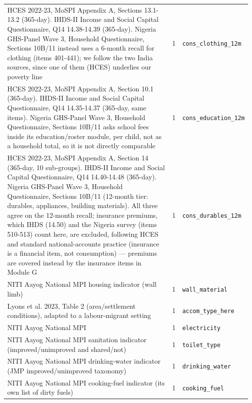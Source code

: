 \documentclass[9pt,a4paper,landscape]{article}
\begin{document}
\begin{longtable}{@{}p{9.5cm}p{1.2cm}p{12.5cm}@{}}
\scriptsize HCES 2022-23, MoSPI Appendix A, Sections 13.1-13.2 (365-day). IHDS-II Income and Social Capital Questionnaire, Q14 14.38-14.39 (365-day). Nigeria GHS-Panel Wave 3, Household Questionnaire, Sections 10B/11 instead uses a 6-month recall for clothing (items 401-441); we follow the two India sources, since one of them (HCES) underlies our poverty line & \scriptsize 1 & \scriptsize\texttt{cons\_clothing\_12m}\\
\scriptsize HCES 2022-23, MoSPI Appendix A, Section 10.1 (365-day). IHDS-II Income and Social Capital Questionnaire, Q14 14.35-14.37 (365-day, same items). Nigeria GHS-Panel Wave 3, Household Questionnaire, Sections 10B/11 asks school fees inside its education/roster module, per child, not as a household total, so it is not directly comparable & \scriptsize 1 & \scriptsize\texttt{cons\_education\_12m}\\
\scriptsize HCES 2022-23, MoSPI Appendix A, Section 14 (365-day, 10 sub-groups). IHDS-II Income and Social Capital Questionnaire, Q14 14.40-14.48 (365-day). Nigeria GHS-Panel Wave 3, Household Questionnaire, Sections 10B/11 (12-month tier: durables, appliances, building materials). All three agree on the 12-month recall; insurance premiums, which IHDS (14.50) and the Nigeria survey (items 510-513) count here, are excluded, following HCES and standard national-accounts practice (insurance is a financial item, not consumption) — premiums are covered instead by the insurance items in Module G & \scriptsize 1 & \scriptsize\texttt{cons\_durables\_12m}\\
\scriptsize NITI Aayog National MPI housing indicator (wall limb) & \scriptsize 1 & \scriptsize\texttt{wall\_material}\\
\scriptsize Lyons et al. 2023, Table 2 (area/settlement conditions), adapted to a labour-migrant setting & \scriptsize 1 & \scriptsize\texttt{accom\_type\_here}\\
\scriptsize NITI Aayog National MPI & \scriptsize 1 & \scriptsize\texttt{electricity}\\
\scriptsize NITI Aayog National MPI sanitation indicator (improved/unimproved and shared/not) & \scriptsize 1 & \scriptsize\texttt{toilet\_type}\\
\scriptsize NITI Aayog National MPI drinking-water indicator (JMP improved/unimproved taxonomy) & \scriptsize 1 & \scriptsize\texttt{drinking\_water}\\
\scriptsize NITI Aayog National MPI cooking-fuel indicator (its own list of dirty fuels) & \scriptsize 1 & \scriptsize\texttt{cooking\_fuel}\\

\end{longtable}
\end{document}
